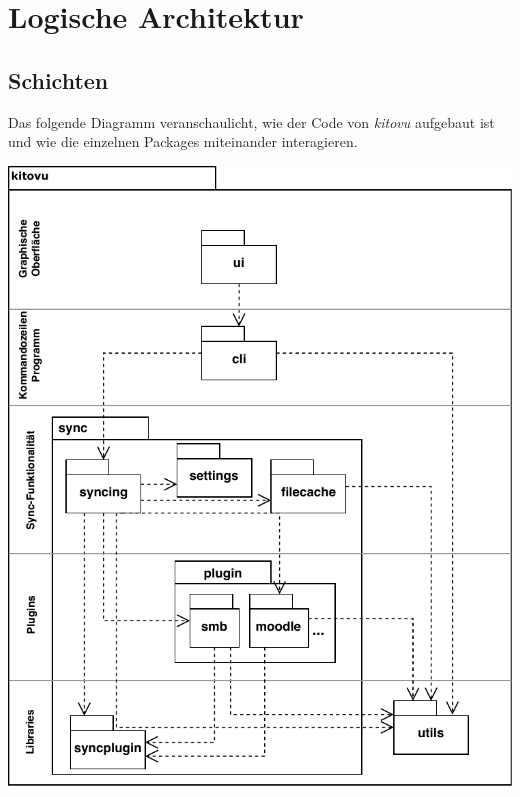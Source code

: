 \documentclass[a4paper]{article}
\let\oldsection\section
\renewcommand\section{\clearpage\oldsection}
\begin{document}
\section{Logische Architektur}



\subsection{Schichten}

Das folgende Diagramm veranschaulicht, wie der Code von \emph{kitovu} aufgebaut ist und wie die einzelnen Packages miteinander interagieren.

\includegraphics[width=40em]{./img/schichtendiagramm.pdf}
\end{document}
